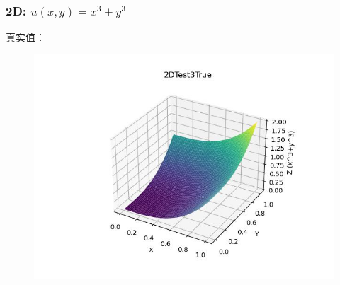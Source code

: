 \documentclass{article}
\begin{document}
\subsubsection{2D: $u(x,y)=x^3+y^3$}
真实值：
\begin{figure}[h]
    \centering
    \includegraphics[width=0.7\linewidth]{2DTest3True.jpg}
\end{figure}
\end{document}
